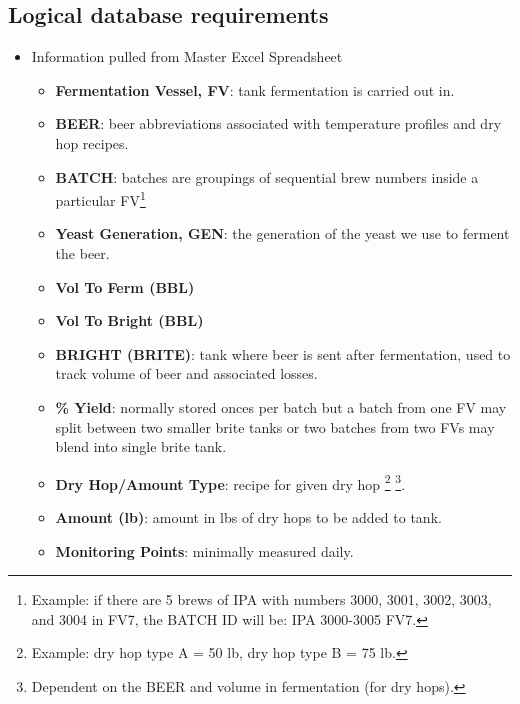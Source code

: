 \documentclass[draftclsnofoot,onecolumn,letterpaper,10pt,compsoc]{IEEEtran}
\begin{document}
	\subsection{Logical database requirements}
    \begin{itemize}
        \item{Information pulled from Master Excel Spreadsheet}
            \begin{itemize}
                \item{\textbf{Fermentation Vessel, FV}: 
                    tank fermentation is carried out in.
                }
                \item{\textbf{BEER}:
                    beer abbreviations associated with temperature profiles and dry hop recipes.
                }
                \item{\textbf{BATCH}:
                    batches are groupings of sequential brew numbers inside a particular FV\footnote{Example: if there are 5 brews of IPA with numbers 3000, 3001, 3002, 3003, and 3004 in FV7, the BATCH ID will be: IPA 3000-3005 FV7.}
                }
                \item{\textbf{Yeast Generation, GEN}:
				    the generation of the yeast we use to ferment the beer.
                }
                \item{\textbf{Vol To Ferm (BBL)}}
                \item{\textbf{Vol To Bright (BBL)}}
                \item{\textbf{BRIGHT (BRITE)}:
                    tank where beer is sent after fermentation, used to track volume of beer and associated losses.
                }
                \item{\textbf{\% Yield}:
                    normally stored onces per batch but a batch from one FV may split between two smaller brite tanks or two batches from two FVs may blend into single brite tank.
                }
                \item{\textbf{Dry Hop/Amount Type}:
                    recipe for given dry hop
                    \footnote{Example: dry hop type A = 50 lb, dry hop type B = 75 lb.}
                    \footnote{Dependent on the BEER and volume in fermentation (for dry hops).}.
                }
                \item{\textbf{Amount (lb)}:
                    amount in lbs of dry hops to be added to tank.
                }
                \item{\textbf{Monitoring Points}:
                    minimally measured daily.
}
\end{itemize}
\end{itemize}
\end{document}
